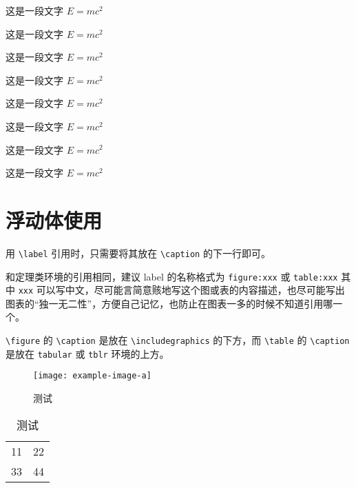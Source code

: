 \begin{corollary}
  这是一段文字 $E = m c^2$
\end{corollary}

\begin{lemma}
  这是一段文字 $E = m c^2$
\end{lemma}

\begin{axiom}
  这是一段文字 $E = m c^2$
\end{axiom}

\begin{antiexample}
  这是一段文字 $E = m c^2$
\end{antiexample}

\begin{conjecture}
  这是一段文字 $E = m c^2$
\end{conjecture}

\begin{question}
  这是一段文字 $E = m c^2$
\end{question}

\begin{claim}
  这是一段文字 $E = m c^2$
\end{claim}

\begin{remark}
  这是一段文字 $E = m c^2$
\end{remark}



\section{浮动体使用}

用 \verb|\label| 引用时，只需要将其放在 \verb|\caption| 的下一行即可。

和定理类环境的引用相同，建议 label 的名称格式为 \verb|figure:xxx| 或 \verb|table:xxx| 其中 \verb|xxx| 可以写中文，尽可能言简意赅地写这个图或表的内容描述，也尽可能写出图表的“独一无二性”，方便自己记忆，也防止在图表一多的时候不知道引用哪一个。

\verb|\figure| 的 \verb|\caption| 是放在 \verb|\includegraphics| 的下方，而 \verb|\table| 的 \verb|\caption| 是放在 \verb|tabular| 或 \verb|tblr| 环境的上方。

\begin{figure}[htbp]
  \centering
  \texttt{[image: example-image-a]}
  \caption{测试}
  \label{figure:test}
\end{figure}

\begin{table}[htbp]
  \centering
  \caption{测试}
  \label{table:test}
  \begin{tabular}{|c|c|}
    11 & 22 \\
    33 & 44 
  \end{tabular}
\end{table}

